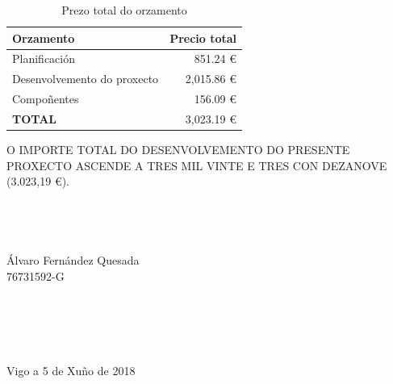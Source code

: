 \documentclass[11pt,twoside]{book}
\begin{document}
\begin{table}[htbt]
  \centering
    \begin{tabular}{|lr|}
    \toprule
    \rowcolor[rgb]{ .31,  .506,  .741} \textcolor[rgb]{ 1,  1,  1}{\textbf{Orzamento}} & \textcolor[rgb]{ 1,  1,  1}{\textbf{Precio total}} \\
    \midrule
    \rowcolor[rgb]{ .863,  .902,  .945} Planificación &                              851.24 €  \\
    \midrule
    Desenvolvemento do proxecto & 2,015.86 \euro \\
    \midrule
    \rowcolor[rgb]{ .863,  .902,  .945} Compoñentes & 156.09 \euro \\
    \midrule
    \rowcolor[rgb]{ .863,  .902,  .945} \textbf{TOTAL} & 3,023.19 \euro \\
    \bottomrule
    \end{tabular}%
\caption{Prezo total do orzamento}
\label{PrezoTotal}
\end{table}

O IMPORTE TOTAL DO DESENVOLVEMENTO DO PRESENTE PROXECTO ASCENDE A TRES MIL VINTE E TRES CON DEZANOVE (3.023,19 \euro).
\\
\\
\\
\\
\\
Álvaro Fernández Quesada \\
76731592-G
\\
\\
\\
\\
\\
\\
Vigo a 5 de Xuño de 2018

\stopcontents[parts]

\cleardoublepage
\end{document}
